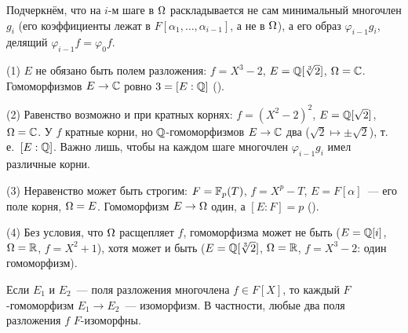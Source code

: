 \par\noindent\begin{minipage}{\linewidth}
\begin{center}
\end{center}
\end{minipage}\par\medskip

Подчеркнём, что на $i$-м шаге в $\Omega$ раскладывается не сам минимальный многочлен $g_i$ (его коэффициенты лежат в
$F[\alpha_1,\dots,\alpha_{i-1}]$, а не в $\Omega$), а его образ $\varphi_{i-1}g_i$, делящий $\varphi_{i-1}f=\varphi_0f$.

\begin{example}[2.12b]
(1) $E$ не обязано быть полем разложения: $f=X^3-2$, $E=\mathbb Q[\sqrt[3]2]$, $\Omega=\mathbb C$. Гомоморфизмов $E\to\mathbb C$ ровно
$3=[E:\mathbb Q]$ ().

(2) Равенство возможно и при кратных корнях: $f=(X^2-2)^2$, $E=\mathbb Q[\sqrt2]$, $\Omega=\mathbb C$. У $f$ кратные корни, но
$\mathbb Q$-гомоморфизмов $E\to\mathbb C$ два ($\sqrt2\mapsto\pm\sqrt2$), т.\,е.\ $[E:\mathbb Q]$. Важно лишь, чтобы на каждом шаге многочлен
$\varphi_{i-1}g_i$ имел различные корни.

(3) Неравенство может быть строгим: $F=\mathbb F_p(T)$, $f=X^p-T$, $E=F[\alpha]$~--- его поле корня, $\Omega=E$. Гомоморфизм
$E\to\Omega$ один, а $[E:F]=p$ ().

(4) Без условия, что $\Omega$ расщепляет $f$, гомоморфизма может не быть ($E=\mathbb Q[i]$, $\Omega=\mathbb R$, $f=X^2+1$), хотя может и
быть ($E=\mathbb Q[\sqrt[3]2]$, $\Omega=\mathbb R$, $f=X^3-2$: один гомоморфизм).
\end{example}

\begin{corollary}[2.13]
Если $E_1$ и $E_2$~--- поля разложения многочлена $f\in F[X]$, то каждый $F$-гомоморфизм $E_1\to E_2$~--- изоморфизм. В
частности, любые два поля разложения $f$ $F$-изоморфны.
\end{corollary}

